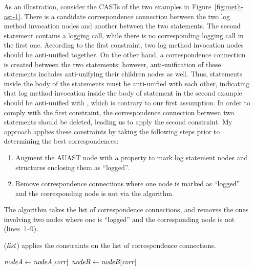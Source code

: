 As an illustration, consider the CASTs of the two examples in Figure~\ref{fig:meth-ast-1}. There is a candidate correspondence connection between the two log method invocation nodes and another between the two  statements. The second  statement contains a logging call, while there is no corresponding logging call in the first one. According to the first constraint, two log method invocation nodes should be anti-unified together. On the other hand, a correspondence connection is created between the two  statements; however, anti-unification of these statements includes anti-unifying their children nodes as well. Thus, statements inside the body of the  statements must be anti-unified with each other, indicating that log method invocation inside the body of  statement in the second example should be anti-unified with \nothing, which is contrary to our first assumption. In order to comply with the first constraint, the correspondence connection between two  statements should be deleted, leading us to apply the second constraint. My approach applies these constraints by taking the following steps prior to determining the best correspondences:
\begin{enumerate} [leftmargin=.4in]
\item	Augment the AUAST node with a property to mark log statement nodes and structures enclosing them as ``logged''.
\item	Remove correspondence connections where one node is marked as ``logged'' and the corresponding node is not via the  algorithm.
\end{enumerate}

The  algorithm takes the list of correspondence connections, and removes the ones involving two nodes where one is ``logged'' and the corresponding node is not (lines~1--9).

\begin{algorithm}
  \caption{($\mathit{list}$) applies the constraints on the list of correspondence connections.}
  \label{computeMatches}
  \begin{algorithmic}[1]
  \ApplyConstraints
      \State $\mathit{nodeA} \gets \mathit{nodeA}[\mathit{corr}]$
	  \State $\mathit{nodeB} \gets \mathit{nodeB}[\mathit{corr}]$
 	  \EndIf 		
 \EndFor 	
	
  \end{algorithmic}
\end{algorithm}




